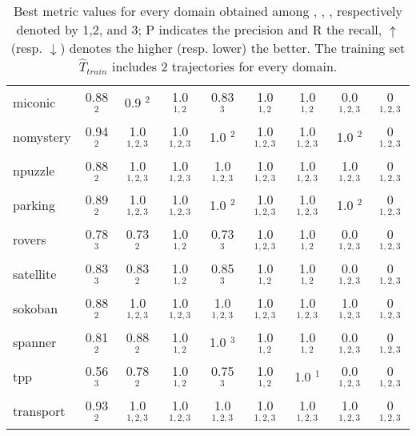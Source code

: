 \begin{table}[h]
{\begin{tabular}{l|c|c|c|c|c|c|c|c}
miconic  & 0.88 $^{2}$ & 0.9 $^{2}$ & 1.0 $^{1,2}$ & 0.83 $^{3}$ & 1.0 $^{1,2}$ & 1.0 $^{1,2}$ & 0.0 $^{1,2,3}$ & 0 $^{1,2,3}$ \\
nomystery  & 0.94 $^{2}$ & 1.0 $^{1,2,3}$ & 1.0 $^{1,2,3}$ & 1.0 $^{2}$ & 1.0 $^{1,2,3}$ & 1.0 $^{1,2,3}$ & 1.0 $^{2}$ & 0 $^{1,2,3}$ \\
npuzzle  & 0.88 $^{2}$ & 1.0 $^{1,2,3}$ & 1.0 $^{1,2,3}$ & 1.0 $^{1,2,3}$ & 1.0 $^{1,2,3}$ & 1.0 $^{1,2,3}$ & 1.0 $^{1,2,3}$ & 0 $^{1,2,3}$ \\
parking  & 0.89 $^{2}$ & 1.0 $^{1,2,3}$ & 1.0 $^{1,2,3}$ & 1.0 $^{2}$ & 1.0 $^{1,2,3}$ & 1.0 $^{1,2,3}$ & 1.0 $^{2}$ & 0 $^{1,2,3}$ \\
rovers  & 0.78 $^{3}$ & 0.73 $^{2}$ & 1.0 $^{1,2}$ & 0.73 $^{3}$ & 1.0 $^{1,2,3}$ & 1.0 $^{1,2}$ & 0.0 $^{1,2,3}$ & 0 $^{1,2,3}$ \\
satellite  & 0.83 $^{3}$ & 0.83 $^{2}$ & 1.0 $^{1,2}$ & 0.85 $^{3}$ & 1.0 $^{1,2}$ & 1.0 $^{1,2}$ & 0.0 $^{1,2,3}$ & 0 $^{1,2,3}$ \\
sokoban  & 0.88 $^{2}$ & 1.0 $^{1,2,3}$ & 1.0 $^{1,2,3}$ & 1.0 $^{1,2,3}$ & 1.0 $^{1,2,3}$ & 1.0 $^{1,2,3}$ & 1.0 $^{1,2,3}$ & 0 $^{1,2,3}$ \\
spanner & 0.81 $^{2}$ & 0.88 $^{2}$ & 1.0 $^{1,2}$ & 1.0 $^{3}$ & 1.0 $^{1,2}$ & 1.0 $^{1,2}$ & 0.0 $^{1,2,3}$ & 0 $^{1,2,3}$ \\
tpp  & 0.56 $^{3}$ & 0.78 $^{2}$ & 1.0 $^{1,2}$ & 0.75 $^{3}$ & 1.0 $^{1,2}$ & 1.0 $^{1}$ & 0.0 $^{1,2,3}$ & 0 $^{1,2,3}$ \\
transport  & 0.93 $^{2}$ & 1.0 $^{1,2,3}$ & 1.0 $^{1,2,3}$ & 1.0 $^{1,2,3}$ & 1.0 $^{1,2,3}$ & 1.0 $^{1,2,3}$ & 1.0 $^{1,2,3}$ & 0 $^{1,2,3}$ \\
\hline
\end{tabular}
}
\caption{Best metric values for every domain obtained among \sam, \offlam, \nolam, respectively denoted by 1,2, and 3; P indicates the precision and R the recall, $\uparrow$ (resp. $\downarrow$) denotes the higher (resp. lower) the better. The training set $\hat{T}_{train}$ includes $2$ trajectories for every domain.}
\end{table}